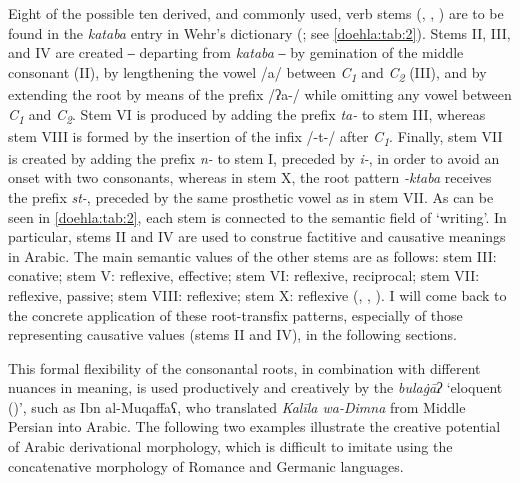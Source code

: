 \documentclass[output=paper]{langscibook}
\begin{document}
Eight of the possible ten derived, and commonly used, verb stems (\citealt{alward_translating_2019}, \citealt[§§163‒173]{fischer_grammatik_1972}, \citealt[100–105]{holes_modern_2004}) are to be found in the \textit{kataba} entry in Wehr's dictionary (\citeyear[812]{wehr_dictionary_1976}; see \autoref{doehla:tab:2}). Stems II, III, and IV are created ‒ departing from \textit{kataba} ‒ by gemination of the middle consonant (II), by lengthening the vowel /a/ between \textit{C\textsubscript{1}} and \textit{C\textsubscript{2}} (III), and by extending the root by means of the prefix /ʔa-/ while omitting any vowel between \textit{C\textsubscript{1}} and \textit{C\textsubscript{2}}. Stem VI is produced by adding the prefix \textit{ta-} to stem III, whereas stem VIII is formed by the insertion of the infix /-t-/ after \textit{C\textsubscript{1}}. Finally, stem VII is created by adding the prefix \textit{n-} to stem I, preceded by \textit{i-}, in order to avoid an onset with two consonants, whereas in stem X, the root pattern \textit{-ktaba} receives the prefix \textit{st-}, preceded by the same prosthetic vowel as in stem VII. As can be seen in \autoref{doehla:tab:2}, each stem is connected to the semantic field of ‘writing’. In particular, stems II and IV are used to construe factitive and causative meanings in Arabic. The main semantic values of the other stems are as follows: stem III: conative; stem V: reflexive, effective; stem VI: reflexive, reciprocal; stem VII: reflexive, passive; stem VIII: reflexive; stem X: reflexive (\citealt[153]{corriente_gramatica_2002}, \citealt[§§163‒172]{fischer_grammatik_1972}, \citealt[100-105]{holes_modern_2004}). I will come back to the concrete application of these root-transfix patterns, especially of those representing causative values (stems II and IV), in the following sections. 

This formal flexibility of the consonantal roots, in combination with different nuances in meaning, is used productively and creatively by the \textit{bulaġāʔ} ‘eloquent (\Pl{})’, such as Ibn al-Muqaffaʕ, who translated \textit{Kalīla wa-Dimna} from Middle Persian into Arabic. The following two examples illustrate the creative potential of Arabic derivational morphology, which is difficult to imitate using the concatenative morphology of Romance and Germanic languages. 
\end{document}
